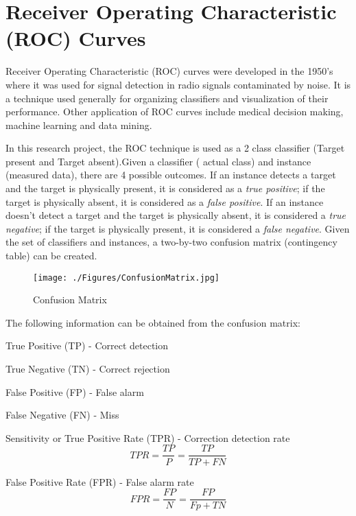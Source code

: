 
\chapter{Receiver Operating Characteristic (ROC) Curves}
\label{AppendixB} 

Receiver Operating Characteristic (ROC) curves were developed in the
1950's where it was used for signal detection in radio signals
contaminated by noise. It is a technique used generally for
organizing classifiers and visualization of their performance. Other
application of ROC curves include medical decision making, machine
learning and data mining.

In this research project, the ROC technique is used as a 2 class
classifier (Target present and Target absent).Given a classifier (
actual class) and instance (measured data), there are 4 possible
outcomes. If an instance detects a target and the target is
physically present, it is considered as a \emph{true positive}; if
the target is physically absent, it is considered as a \emph{false
positive}. If an instance doesn't detect a target and the target is
physically absent, it is considered a \emph{true negative}; if the
target is physically present, it is considered a \emph{false
negative}. Given the set of classifiers and instances, a two-by-two
confusion matrix (contingency table) can be created.

\begin{figure}[htbp]
\centering
\texttt{[image: ./Figures/ConfusionMatrix.jpg]}
\caption[Confusion Matrix ]{Confusion Matrix}
\label{fig:ConfusionMatrix}
\end{figure}

The following information can be obtained from the confusion matrix:

True Positive (TP) - Correct detection

True Negative (TN) - Correct rejection

False Positive (FP) - False alarm

False Negative (FN) - Miss

Sensitivity or True Positive Rate (TPR) - Correction detection rate
\begin{equation}\label{eq:TPR}
TPR = \frac{TP}{P} = \frac{TP}{TP+FN}
\end{equation}

False Positive Rate (FPR) - False alarm rate
\begin{equation}\label{eq:FPR}
FPR = \frac{FP}{N} = \frac{FP}{Fp+TN}
\end{equation}

